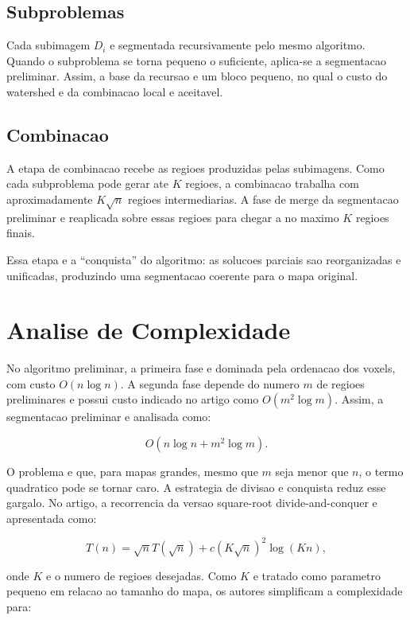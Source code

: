 \documentclass[tcc1]{uftex}
\begin{document}
\section{Subproblemas}

Cada subimagem $D_i$ e segmentada recursivamente pelo mesmo algoritmo. Quando o subproblema se torna pequeno o suficiente, aplica-se a segmentacao preliminar. Assim, a base da recursao e um bloco pequeno, no qual o custo do watershed e da combinacao local e aceitavel.

\section{Combinacao}

A etapa de combinacao recebe as regioes produzidas pelas subimagens. Como cada subproblema pode gerar ate $K$ regioes, a combinacao trabalha com aproximadamente $K\sqrt{n}$ regioes intermediarias. A fase de merge da segmentacao preliminar e reaplicada sobre essas regioes para chegar a no maximo $K$ regioes finais.

Essa etapa e a ``conquista'' do algoritmo: as solucoes parciais sao reorganizadas e unificadas, produzindo uma segmentacao coerente para o mapa original.

\chapter{Analise de Complexidade}

No algoritmo preliminar, a primeira fase e dominada pela ordenacao dos voxels, com custo $O(n \log n)$. A segunda fase depende do numero $m$ de regioes preliminares e possui custo indicado no artigo como $O(m^2 \log m)$. Assim, a segmentacao preliminar e analisada como:

\begin{equation}
O(n \log n + m^2 \log m).
\end{equation}

O problema e que, para mapas grandes, mesmo que $m$ seja menor que $n$, o termo quadratico pode se tornar caro. A estrategia de divisao e conquista reduz esse gargalo. No artigo, a recorrencia da versao square-root divide-and-conquer e apresentada como:

\begin{equation}
T(n) = \sqrt{n}T(\sqrt{n}) + c(K\sqrt{n})^2\log(Kn),
\end{equation}

onde $K$ e o numero de regioes desejadas. Como $K$ e tratado como parametro pequeno em relacao ao tamanho do mapa, os autores simplificam a complexidade para:
\end{document}
